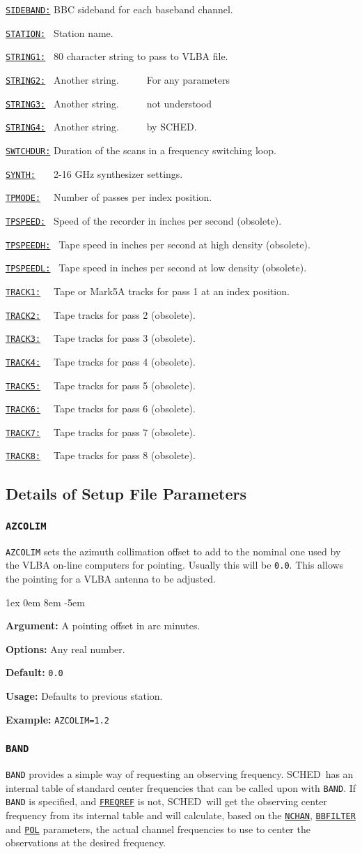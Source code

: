 \documentclass{report}
\newcommand{\sched}{{\sc SCHED}}
\newcommand{\schedb}{{\sc SCHED~}}
\newcommand{\rcwbox}[5]{
  \begin{list}{}{\parsep 1ex  \itemsep 0em
                 \leftmargin 8em  \itemindent -5em }
    \item {\bf Argument:} #1
    \item {\bf Options:}  #2
    \item {\bf Default:}  #3
    \item {\bf Usage:}    #4
    \item {\bf Example:}  #5
  \end{list}
}
\newcommand{\htls}[2]%
{\item
  \hyperref[SP:#1]{{\tt #1:}}{\tt #2}%
}
\newcommand{\htlt}[3]%
{\item
  \hyperref[SP:#2]{{\tt #1:}}{\tt #3}%
}
\begin{document}
\begin{list}{~}{\parsep 0em  \itemsep 0em }
\htls{SIDEBAND}{} BBC sideband for each baseband channel.
\htls{STATION}{~} Station name.
\htls{STRING1}{~} 80 character string to pass to VLBA file.
\htlt{STRING2}{STRING1}{~} Another string. ~~~~~For any parameters
\htlt{STRING3}{STRING1}{~} Another string. ~~~~~not understood
\htlt{STRING4}{STRING1}{~} Another string. ~~~~~by \sched.
\htls{SWTCHDUR}{} Duration of the scans in a frequency switching loop.
\htls{SYNTH}{~~~} 2-16 GHz synthesizer settings.
\htls{TPMODE}{~~} Number of passes per index position.
\htls{TPSPEED}{~} Speed of the recorder in inches per second (obsolete).
\htls{TPSPEEDH}{~} Tape speed in inches per second at high density (obsolete).
\htls{TPSPEEDL}{~} Tape speed in inches per second at low density (obsolete).
\htls{TRACK1}{~~} Tape or Mark5A tracks for pass 1 at an index position.
\htlt{TRACK2}{TRACK1}{~~} Tape tracks for pass 2 (obsolete).
\htlt{TRACK3}{TRACK1}{~~} Tape tracks for pass 3 (obsolete).
\htlt{TRACK4}{TRACK1}{~~} Tape tracks for pass 4 (obsolete).
\htlt{TRACK5}{TRACK1}{~~} Tape tracks for pass 5 (obsolete).
\htlt{TRACK6}{TRACK1}{~~} Tape tracks for pass 6 (obsolete).
\htlt{TRACK7}{TRACK1}{~~} Tape tracks for pass 7 (obsolete).
\htlt{TRACK8}{TRACK1}{~~} Tape tracks for pass 8 (obsolete).
\end{list}




\subsection{\label{SSEC:SETDET}Details of Setup File Parameters}

\subsubsection{\label{SP:AZCOLIM}{\tt AZCOLIM}}

{\tt AZCOLIM} sets the azimuth collimation offset to add to the nominal
one used by the VLBA on-line computers for pointing. Usually this will
be {\tt 0.0}.  This allows the pointing for a VLBA antenna to be
adjusted.

\rcwbox
{A pointing offset in arc minutes.}
{Any real number.}
{{\tt 0.0}}
{Defaults to previous station.}
{{\tt AZCOLIM=1.2}}


\subsubsection{\label{SP:BAND}{\tt BAND}}

{\tt BAND} provides a simple way of requesting an observing frequency.
\schedb has an internal table of standard center frequencies that can
be called upon with {\tt BAND}.  If {\tt BAND} is specified, and
{\hyperref[SP:FREQREF]{{\tt FREQREF}}} is not, \schedb will get the
observing center frequency from its internal table and will calculate,
based on the 
{\hyperref[SP:NCHAN]{{\tt NCHAN}}}, 
{\hyperref[SP:BBFILTER]{{\tt BBFILTER}}} and 
{\hyperref[SP:POL]{{\tt POL}}} parameters,
the actual channel frequencies to use to center the observations at
the desired frequency.
\end{document}
